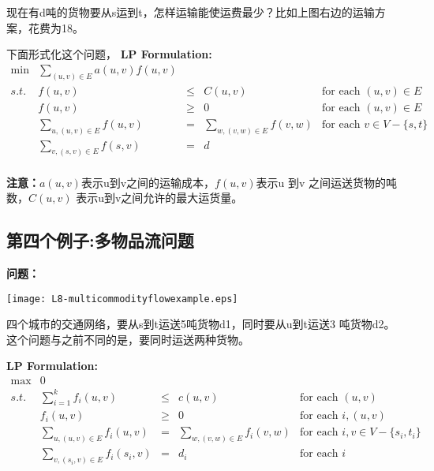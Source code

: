 现在有d吨的货物要从s运到t，怎样运输能使运费最少？比如上图右边的运输方案，花费为18。

下面形式化这个问题，
\textbf{LP Formulation:}
\[
\begin{array}{rrrrl}
 \min & \sum_{(u, v) \in E} a(u,v)  f(u, v)   & & & \\
 s.t. & f(u,v)   & \leq & C(u,v) & \text{for each } (u,v) \in E\\
      & f(u,v)                & \geq & 0 &  \text{for each }  (u, v) \in E\\
      & \sum_{u, (u, v) \in E} f (u,v) & = & \sum_{w, (v, w) \in E} f (v,w)  & \text{for each }  v\in V-\{s, t\}\\
      & \sum_{v, (s, v) \in E} f( s, v) &=& d &  \\
\end{array} \nonumber
\]

\textbf{注意：}$a(u,v)$表示u到v之间的运输成本，$f(u, v)$表示u 到v 之间运送货物的吨数，$C(u,v)$ 表示u到v之间允许的最大运货量。

\subsection{第四个例子:多物品流问题}
\textbf{问题：}
\begin{center}
	\texttt{[image: L8-multicommodityflowexample.eps]}
\end{center}


四个城市的交通网络，要从s到t运送5吨货物d1，同时要从u到t运送3 吨货物d2。这个问题与之前不同的是，要同时运送两种货物。

\textbf{LP Formulation:}
\[
\begin{array}{rrrrl}
 \max & 0   & & & \\
 s.t. & \sum_{i=1}^k f_i(u,v)   & \leq & c(u,v) & \text{for each } (u,v) \\
      & f_i(u,v)                & \geq & 0 &  \text{for each }  i, (u, v) \\
      & \sum_{u, (u, v) \in E} f_i (u,v) & = & \sum_{w, (v, w) \in E} f_i (v,w)  & \text{for each } i, v\in V-\{s_i, t_i\} \\
      & \sum_{v, (s_i, v) \in E} f_i( s_{i}, v) &=& d_i & \text{for each }  i\\
\end{array} \nonumber
\]

